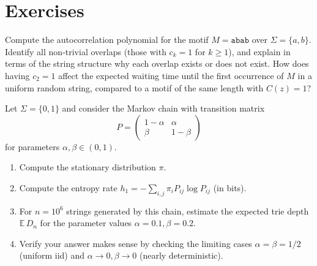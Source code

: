 \section*{Exercises}

\begin{exercise}
\label{ch17:ex-autocorrelation-abab}
Compute the autocorrelation polynomial for the motif $M = \texttt{abab}$ over $\Sigma = \{a, b\}$. Identify all non-trivial overlaps (those with $c_k = 1$ for $k \geq 1$), and explain in terms of the string structure why each overlap exists or does not exist. How does having $c_2 = 1$ affect the expected waiting time until the first occurrence of $M$ in a uniform random string, compared to a motif of the same length with $C(z) = 1$?
\end{exercise}

\begin{exercise}
\label{ch17:ex-entropy-trie}
Let $\Sigma = \{0, 1\}$ and consider the Markov chain with transition matrix
\[
  P = \begin{pmatrix} 1 - \alpha & \alpha \\ \beta & 1 - \beta \end{pmatrix}
\]
for parameters $\alpha, \beta \in (0, 1)$.
\begin{enumerate}
  \item[(a)] Compute the stationary distribution $\pi$.
  \item[(b)] Compute the entropy rate $h_1 = -\sum_{i,j} \pi_i P_{ij} \log P_{ij}$ (in bits).
  \item[(c)] For $n = 10^6$ strings generated by this chain, estimate the expected trie depth $\mathbb{E}\, D_n$ for the parameter values $\alpha = 0.1, \beta = 0.2$.
  \item[(d)] Verify your answer makes sense by checking the limiting cases $\alpha = \beta = 1/2$ (uniform iid) and $\alpha \to 0, \beta \to 0$ (nearly deterministic).
\end{enumerate}
\end{exercise}
